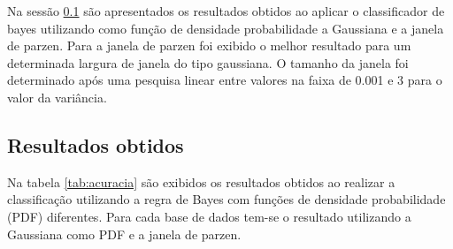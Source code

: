 \documentclass[ 
	article,			%
	11pt,				%
	oneside,			%
	a4paper,			%
	english,			%
	brazil,				%
	]{abntex2}
\begin{document}
Na sessão \ref{ss:resultadosObtidos} são apresentados os resultados obtidos ao
aplicar o classificador de bayes utilizando como função de densidade probabilidade a Gaussiana e a
janela de parzen. Para a janela de parzen foi exibido o melhor resultado para um
determinada largura de janela do tipo gaussiana. O tamanho da janela foi
determinado após uma pesquisa linear entre valores na faixa de 0.001 e 3 para o
valor da variância.
 
\subsection{Resultados obtidos}
\label{ss:resultadosObtidos}

Na tabela \ref{tab:acuracia} são exibidos os resultados obtidos ao realizar a
classificação utilizando a regra de Bayes com funções de densidade probabilidade
(PDF) diferentes. Para cada base de dados tem-se o resultado utilizando a
Gaussiana como PDF e a janela de parzen.
\end{document}

